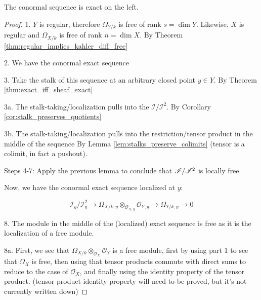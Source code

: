 \begin{corollary}
\begin{theorem}
  \label{thm:regular_implies_conormal_exact}
  The conormal sequence is exact on 
  the left.
\end{theorem}

\begin{proof}

  1. $Y$ is regular, therefore 
     $\Omega_{Y/k}$ is free of rank
     $s = \dim Y$.
     Likewise, $X$ is regular and
     $\Omega_{X/k}$ is free of rank
     $n = \dim X$.
  By Theorem \ref{thm:regular_implies_kahler_diff_free}
  
  2. We have the conormal exact sequence

  3. Take the stalk of this sequence at an
     arbitrary closed point $y \in Y$.
     By Theorem \ref{thm:exact_iff_sheaf_exact}

  3a. The stalk-taking/localization
      pulls into the $\mathcal{I} / \mathcal{I}^2$.
      By Corollary \ref{cor:stalk_preserves_quotients}

  3b. The stalk-taking/localization
      pulls into the restriction/tensor product
      in the middle of the sequence
      By Lemma \ref{lem:stalks_preserve_colimits} 
      (tensor is a colimit, in fact a pushout).
  
  Steps 4-7: Apply the previous lemma to conclude that
  $\mathscr{I} / \mathscr{I}^{2}$ is locally free.

  Now, we have the conormal exact sequence localized at $y$:

  \[
    \mathcal{I}_y / \mathcal{I}^2_y 
    \to
    \Omega_{X/k,y} \otimes_{\mathcal{O}_{X,y}} \mathcal{O}_{Y,y} 
    \to
    \Omega_{Y/k,y} 
    \to 0
  \]

  8. The module in the middle of the (localized) exact sequence is free as it is 
     the localization of a free module. 

  8a. First, we see that $\Omega_{X/k} \otimes_{\mathcal{O}_X} \mathcal{O}_Y$ is a free module,
      first by using part 1 to see that $\Omega_X$ is free, then using that
      tensor products commute with direct sums to reduce to the case of $\mathcal{O}_X$,
      and finally using the identity property of the tensor product.
      (tensor product identity property will need to be proved, but it's not currently written down)


\end{proof}
\end{corollary}
